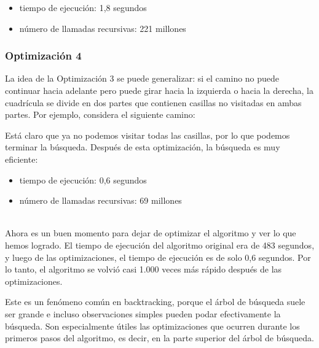 \begin{itemize}[itemsep=0em,topsep=0.5em]
    \item tiempo de ejecución: 1,8 segundos
    \item número de llamadas recursivas: 221 millones
\end{itemize}

\subsubsection{Optimización 4}

La idea de la Optimización 3
se puede generalizar:
si el camino no puede continuar hacia adelante
pero puede girar hacia la izquierda o hacia la derecha,
la cuadrícula se divide en dos partes
que contienen casillas no visitadas en ambas partes.
Por ejemplo, considera el siguiente camino:

\begin{center}
\end{center}
Está claro que ya no podemos visitar todas las casillas,
por lo que podemos terminar la búsqueda.
Después de esta optimización, la búsqueda es
muy eficiente:

\begin{itemize}[itemsep=0em,topsep=0.5em]
    \item tiempo de ejecución: 0,6 segundos
    \item número de llamadas recursivas: 69 millones
\end{itemize}

~\\
Ahora es un buen momento para dejar de optimizar
el algoritmo y ver lo que hemos logrado.
El tiempo de ejecución del algoritmo original
era de 483 segundos,
y luego de las optimizaciones,
el tiempo de ejecución es de solo 0,6 segundos.
Por lo tanto, el algoritmo se volvió casi 1.000 veces
más rápido después de las optimizaciones.

Este es un fenómeno común en backtracking,
porque el árbol de búsqueda suele ser grande
e incluso observaciones simples pueden podar efectivamente
la búsqueda.
Son especialmente útiles las optimizaciones que
ocurren durante los primeros pasos del algoritmo,
es decir, en la parte superior del árbol de búsqueda.

